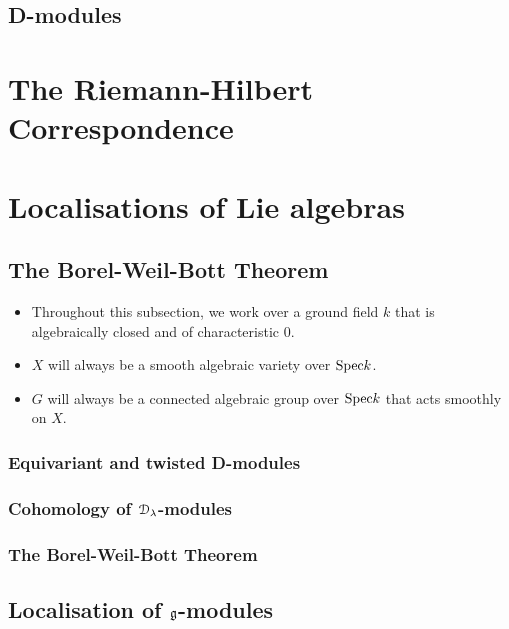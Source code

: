         \subsection{D-modules}
        
    \section{The Riemann-Hilbert Correspondence}
    
    \section{Localisations of Lie algebras}
        \subsection{The Borel-Weil-Bott Theorem}
            \begin{convention}
                \noindent
                \begin{itemize}
                    \item Throughout this subsection, we work over a ground field $k$ that is algebraically closed and of characteristic $0$. 
                    \item $X$ will always be a smooth algebraic variety over $\mathrm{Spec} k$.
                    \item $G$ will always be a connected algebraic group over $\mathrm{Spec} k$ that acts smoothly on $X$.
                \end{itemize}
            \end{convention}
            
            \subsubsection{Equivariant and twisted D-modules}
            
            \subsubsection{Cohomology of \texorpdfstring{$\mathcal{D}_{\lambda}$}{}-modules}
            
            \subsubsection{The Borel-Weil-Bott Theorem}
        
        \subsection{Localisation of \texorpdfstring{$\mathfrak{g}$}{}-modules}
        
